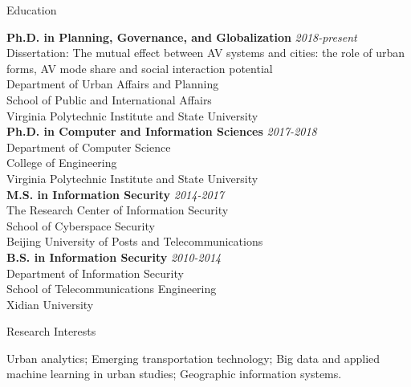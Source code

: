 \documentclass{resume} %
\begin{document}

\begin{rSection}{Education}

{\bf Ph.D. in Planning, Governance, and Globalization} \hfill {\em 2018-present} \\ 
Dissertation: The mutual effect between AV systems and cities: the role of urban forms, AV mode share and social interaction potential\\
Department of Urban Affairs and Planning\\
School of Public and International Affairs\\
Virginia Polytechnic Institute and State University\\
{\bf Ph.D. in Computer and Information Sciences} \hfill {\em 2017-2018} \\ 
Department of Computer Science\\
College of Engineering\\
Virginia Polytechnic Institute and State University\\
{\bf M.S. in Information Security} \hfill {\em 2014-2017} \\ 
The Research Center of Information Security\\
School of Cyberspace Security\\
Beijing University of Posts and Telecommunications\\
{\bf B.S. in Information Security} \hfill {\em 2010-2014} \\ 
Department of Information Security\\
School of Telecommunications Engineering\\
Xidian University
\end{rSection}


\begin{rSection}{Research Interests}

Urban analytics; Emerging transportation technology; Big data and applied machine learning in urban studies; Geographic information systems.


\end{rSection}
\end{document}
